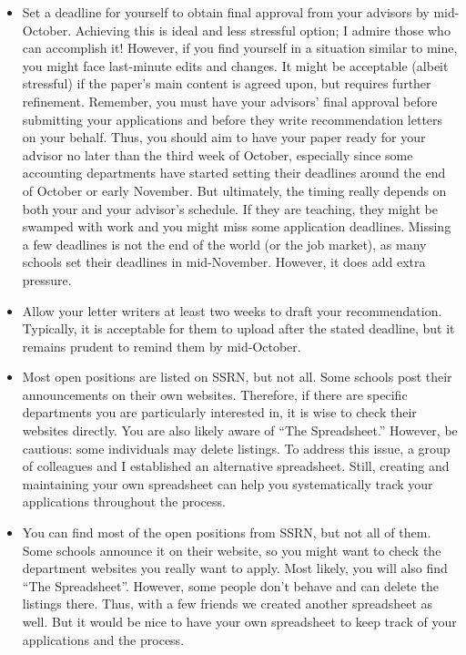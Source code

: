 \documentclass[12pt]{article}
\begin{document}
\begin{itemize}
\item Set a deadline for yourself to obtain final approval from your advisors by mid-October. Achieving this is ideal and less stressful option; I admire those who can accomplish it! However, if you find yourself in a situation similar to mine, you might face last-minute edits and changes. It might be acceptable (albeit stressful) if the paper's main content is agreed upon, but requires further refinement. Remember, you must have your advisors' final approval before submitting your applications and before they write recommendation letters on your behalf. Thus, you should aim to have your paper ready for your advisor no later than the third week of October, especially since some accounting departments have started setting their deadlines around the end of October or early November. But ultimately, the timing really depends on both your and your advisor's schedule. If they are teaching, they might be swamped with work and you might miss some application deadlines. Missing a few deadlines is not the end of the world (or the job market), as many schools set their deadlines in mid-November. However, it does add extra pressure.
\item Allow your letter writers at least two weeks to draft your recommendation. Typically, it is acceptable for them to upload after the stated deadline, but it remains prudent to remind them by mid-October.
\item Most open positions are listed on SSRN, but not all. Some schools post their announcements on their own websites. Therefore, if there are specific departments you are particularly interested in, it is wise to check their websites directly. You are also likely aware of ``The Spreadsheet.'' However, be cautious: some individuals may delete listings. To address this issue, a group of colleagues and I established an alternative spreadsheet. Still, creating and maintaining your own spreadsheet can help you systematically track your applications throughout the process.
\item You can find most of the open positions from SSRN, but not all of them. Some schools announce it on their website, so you might want to check the department websites you really want to apply. Most likely, you will also find ``The Spreadsheet''. However, some people don't behave and can delete the listings there. Thus, with a few friends we created another spreadsheet as well. But it would be nice to have your own spreadsheet to keep track of your applications and the process.

\end{itemize}
\end{document}
